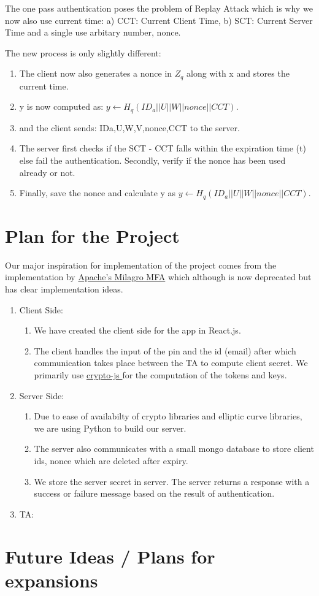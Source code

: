 \documentclass[]{article}   %
\begin{document}
The one pass authentication poses the problem of Replay Attack which is why we now also use current time: a) CCT: Current Client Time, b) SCT: Current Server Time and a single use arbitary number, nonce.

The new process is only slightly different:
\begin{enumerate}
    \item The client now also generates a nonce in $Z_q$ along with x and stores the current time.
    \item y is now computed as: $y \leftarrow H_q (ID_a || U || W || nonce || CCT).$
    \item and the client sends: {IDa,U,W,V,nonce,CCT} to the server.
    \item The server first checks if the SCT - CCT falls within the expiration time (t) else fail the authentication. Secondly, verify if the nonce has been used already or not.
    \item Finally, save the nonce and calculate y as \newline $y \leftarrow H_q (ID_a || U || W || nonce || CCT).$
\end{enumerate}

\newpage
\section*{Plan for the Project}
Our major inspiration for implementation of the project comes from the implementation by \href{https://web.archive.org/web/20161107110119/http://docs.milagro.io/en/mfa/getting-started/milagro-mfa-developer-guide.html}{Apache's Milagro MFA} which although is now deprecated but has clear implementation ideas.
\begin{enumerate}
    \item Client Side:
        \begin{enumerate}
            \item We have created the client side for the app in React.js.
            \item The client handles the input of the pin and the id (email) after which communication takes place between the TA to compute client secret. We primarily use \href{https://www.npmjs.com/package/crypto-js}{ crypto-js } for the computation of the tokens and keys.
        \end{enumerate}
    \item Server Side:
    \begin{enumerate}
        \item Due to ease of availabilty of crypto libraries and elliptic curve libraries, we are using Python to build our server.
        \item The server also communicates with a small mongo database to store client ids, nonce which are deleted after expiry. 
        \item We store the server secret in server. The server returns a response with a success or failure message based on the result of authentication. 
    \end{enumerate}
    \item TA:
\end{enumerate}
\newpage
\section*{Future Ideas / Plans for expansions}


\nocite{*}


\end{document}
